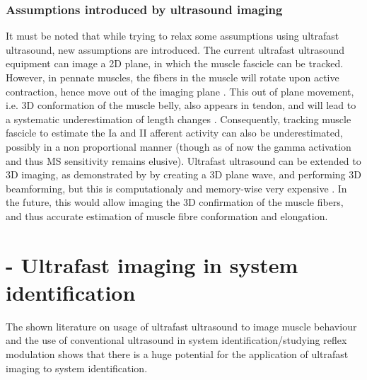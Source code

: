 \subsubsection{Assumptions introduced by ultrasound imaging}
It must be noted that while trying to relax some assumptions using ultrafast ultrasound, new assumptions are introduced. The current ultrafast ultrasound equipment can image a 2D plane, in which the muscle fascicle can be tracked. However, in pennate muscles, the fibers in the muscle will rotate upon active contraction, hence move out of the imaging plane \cite{finni_structural_2006}. This out of plane movement, i.e. 3D conformation of the muscle belly, also appears in tendon, and will lead to a systematic underestimation of length changes \cite{seynnes_ultrasound-based_2014}. Consequently, tracking muscle fascicle to estimate the Ia and II afferent activity can also be underestimated, possibly in a non proportional manner (though as of now the gamma activation and thus MS sensitivity remains elusive). Ultrafast ultrasound can be extended to 3D imaging, as demonstrated by \citeauthor{provost_3d_2014} by creating a 3D plane wave, and performing 3D beamforming, but this is computationaly and memory-wise very expensive \cite{provost_3d_2014}. In the future, this would allow imaging the 3D confirmation of the muscle fibers, and thus accurate estimation of muscle fibre conformation and elongation. 



\section{\tred[replacement] - Ultrafast imaging in system identification}
The shown literature on usage of ultrafast ultrasound to image muscle behaviour and the use of conventional ultrasound in system identification/studying reflex modulation shows that there is a huge potential for the application of ultrafast imaging to system identification. 

